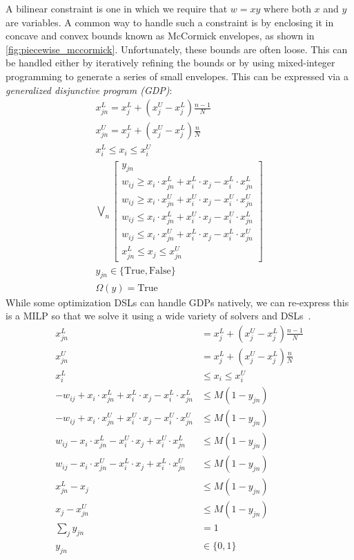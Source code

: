 \documentclass{article}
\begin{document}
A bilinear constraint is one in which we require that $w=xy$ where both $x$ and $y$ are variables. A common way to handle such a constraint is by enclosing it in concave and convex bounds known as McCormick envelopes, as shown in \autoref{fig:piecewise_mccormick}. Unfortunately, these bounds are often loose. This can be handled either by iteratively refining the bounds or by using mixed-integer programming to generate a series of small envelopes. This can be expressed via a \textit{generalized disjunctive program (GDP)}: %
\begin{gather}
x_{jn}^L = x_j^L + (x_j^U-x_j^L) \frac{n-1}{N} \\
x_{jn}^U = x_j^L + (x_j^U-x_j^L) \frac{n}{N} \\
x_i^L \le x_i \le x_i^U \\
\bigvee_n\begin{bmatrix}
y_{jn} \\
w_{ij} \ge x_i\cdot x_{jn}^L + x_i^L \cdot x_j - x_i^L \cdot x_{jn}^L \\
w_{ij} \ge x_i\cdot x_{jn}^U + x_i^U \cdot x_j - x_i^U \cdot x_{jn}^U \\
w_{ij} \le x_i\cdot x_{jn}^L + x_i^U \cdot x_j - x_i^U \cdot x_{jn}^L \\
w_{ij} \le x_i\cdot x_{jn}^U + x_i^L \cdot x_j - x_i^L \cdot x_{jn}^U \\
x_{jn}^L \le x_j \le x_{jn}^U
\end{bmatrix} \\
y_{jn}\in\{\textrm{True},\textrm{False}\} \\
\Omega(y) = \textrm{True}
\end{gather}
While some optimization DSLs can handle GDPs natively, we can re-express this is a MILP so that we solve it using a wide variety of solvers and DSLs~\citep{Grossman2012}.
\begin{align}
x_{jn}^L &= x_j^L + (x_j^U-x_j^L) \frac{n-1}{N} \\
x_{jn}^U &= x_j^L + (x_j^U-x_j^L) \frac{n}{N} \\
x_i^L &\le x_i \le x_i^U \\
-w_{ij} + x_i\cdot x_{jn}^L + x_i^L \cdot x_j - x_i^L \cdot x_{jn}^L &\le M(1-y_{jn}) \\
-w_{ij} + x_i\cdot x_{jn}^U + x_i^U \cdot x_j - x_i^U \cdot x_{jn}^U &\le M(1-y_{jn}) \\
w_{ij} - x_i\cdot x_{jn}^L - x_i^U \cdot x_j + x_i^U \cdot x_{jn}^L &\le M(1-y_{jn})  \\
w_{ij} - x_i\cdot x_{jn}^U - x_i^L \cdot x_j + x_i^L \cdot x_{jn}^U &\le M(1-y_{jn})  \\
x_{jn}^L - x_j &\le M(1-y_{jn}) \\
x_j - x_{jn}^U &\le M(1-y_{jn}) \\
\sum_j y_{jn} &= 1 \\
y_{jn}&\in\{0,1\}
\end{align}
\end{document}
